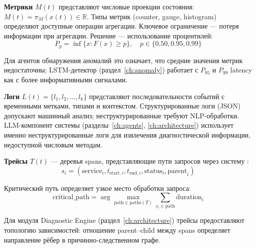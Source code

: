 \textbf{Метрики} $M(t)$ представляют числовые проекции состояния: $M(t) = \pi_M(x(t)) \in \mathbb{R}$. Типы метрик (counter, gauge, histogram) определяют доступные операции агрегации. Ключевое ограничение --- потеря информации при агрегации. Решение --- использование процентилей:
\begin{equation}
P_p = \inf\{x : F(x) \geq p\}, \quad p \in \{0.50, 0.95, 0.99\}
\label{eq:percentile}
\end{equation}

Для агентов обнаружения аномалий это означает, что средние значения метрик недостаточны; LSTM-детектор (раздел~\ref{ch:anomaly}) работает с $P_{95}$ и $P_{99}$ latency как с более информативными сигналами.

\textbf{Логи} $L(t) = \{l_1, l_2, \ldots, l_k\}$ представляют последовательности событий с временными метками, типами и контекстом. Структурированные логи (JSON) допускают машинный анализ; неструктурированные требуют NLP-обработки. LLM-компонент системы (разделы~\ref{ch:agents}, \ref{ch:architecture}) использует именно неструктурированные логи для извлечения диагностической информации, недоступной числовым методам.

\textbf{Трейсы} $T(t)$ --- деревья spans, представляющие пути запросов через систему \cite{distributed_tracing,distributed_tracing_survey,acm_observability}:
\begin{equation}
s_i = (\text{service}_i, t_{\text{start},i}, t_{\text{end},i}, \text{status}_i, \text{parent}_i)
\label{eq:span_tuple}
\end{equation}

Критический путь определяет узкое место обработки запроса:
\begin{equation}
\text{critical\_path} = \arg\max_{\text{path} \in \text{paths}(T)} \sum_{s_i \in \text{path}} \text{duration}_i
\label{eq:critical_path}
\end{equation}

Для модуля Diagnostic Engine (раздел~\ref{ch:architecture}) трейсы предоставляют топологию зависимостей: отношение parent--child между spans определяет направление рёбер в причинно-следственном графе.

